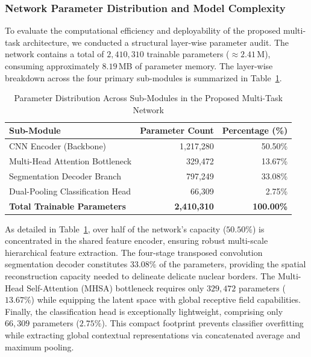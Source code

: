 \documentclass[pdflatex,sn-nature]{sn-jnl}%
\theoremstyle{thmstyleone}%
\theoremstyle{thmstyletwo}%
\theoremstyle{thmstylethree}%
\begin{document}
\subsubsection{Network Parameter Distribution and Model Complexity}
To evaluate the computational efficiency and deployability of the proposed multi-task architecture, we conducted a structural layer-wise parameter audit. The network contains a total of $2,410,310$ trainable parameters ($\approx 2.41$\,M), consuming approximately $8.19$\,MB of parameter memory. The layer-wise breakdown across the four primary sub-modules is summarized in Table~\ref{tab:param_distribution}.

\begin{table}[htbp]
\centering
\caption{Parameter Distribution Across Sub-Modules in the Proposed Multi-Task Network}
\label{tab:param_distribution}
\begin{tabular}{lrr}
\hline
\textbf{Sub-Module} & \textbf{Parameter Count} & \textbf{Percentage (\%)} \\
\hline
CNN Encoder (Backbone)          & 1,217,280 & 50.50\% \\
Multi-Head Attention Bottleneck &   329,472 & 13.67\% \\
Segmentation Decoder Branch     &   797,249 & 33.08\% \\
Dual-Pooling Classification Head&    66,309 &  2.75\% \\
\hline
\textbf{Total Trainable Parameters} & \textbf{2,410,310} & \textbf{100.00\%} \\
\hline
\end{tabular}
\end{table}

As detailed in Table~\ref{tab:param_distribution}, over half of the network's capacity ($50.50\%$) is concentrated in the shared feature encoder, ensuring robust multi-scale hierarchical feature extraction. The four-stage transposed convolution segmentation decoder constitutes $33.08\%$ of the parameters, providing the spatial reconstruction capacity needed to delineate delicate nuclear borders. The Multi-Head Self-Attention (MHSA) bottleneck requires only $329,472$ parameters ($13.67\%$) while equipping the latent space with global receptive field capabilities. Finally, the classification head is exceptionally lightweight, comprising only $66,309$ parameters ($2.75\%$). This compact footprint prevents classifier overfitting while extracting global contextual representations via concatenated average and maximum pooling.
\end{document}
